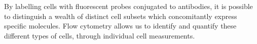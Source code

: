 



By labelling cells with fluorescent probes conjugated to antibodies, it is possible to distinguish a wealth of distinct cell
subsets which concomitantly express specific molecules.
Flow cytometry allows us to identify and quantify these different types of cells, through individual cell measurements.

